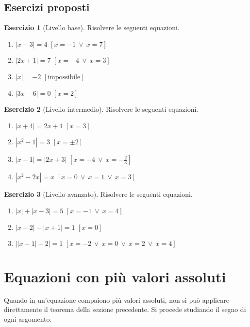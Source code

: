 \documentclass[12pt,a4paper,openany]{book}
\theoremstyle{definition}
\newtheorem{esercizio}{Esercizio}[section]
\theoremstyle{plain}
\theoremstyle{remark}
\newcommand{\abs}[1]{\left|#1\right|}
\begin{document}
\subsection*{Esercizi proposti}

\begin{esercizio}[Livello base]
Risolvere le seguenti equazioni.
\begin{enumerate}[label=\alph*)]
\item $\abs{x-3}=4$ \hfill $[x=-1\ \lor\ x=7]$
\item $\abs{2x+1}=7$ \hfill $[x=-4\ \lor\ x=3]$
\item $\abs{x}=-2$ \hfill $[\text{impossibile}]$
\item $\abs{3x-6}=0$ \hfill $[x=2]$
\end{enumerate}
\end{esercizio}

\begin{esercizio}[Livello intermedio]
Risolvere le seguenti equazioni.
\begin{enumerate}[label=\alph*)]
\item $\abs{x+4}=2x+1$ \hfill $[x=3]$
\item $\abs{x^2-1}=3$ \hfill $[x=\pm 2]$
\item $\abs{x-1}=\abs{2x+3}$ \hfill $[x=-4\ \lor\ x=-\tfrac23]$
\item $\abs{x^2-2x}=x$ \hfill $[x=0\ \lor\ x=1\ \lor\ x=3]$
\end{enumerate}
\end{esercizio}

\begin{esercizio}[Livello avanzato]
Risolvere le seguenti equazioni.
\begin{enumerate}[label=\alph*)]
\item $\abs{x}+\abs{x-3}=5$ \hfill $[x=-1\ \lor\ x=4]$
\item $\abs{x-2}-\abs{x+1}=1$ \hfill $[x=0]$
\item $\bigl|\abs{x-1}-2\bigr|=1$ \hfill $[x=-2\ \lor\ x=0\ \lor\ x=2\ \lor\ x=4]$
\end{enumerate}
\end{esercizio}

\section{Equazioni con più valori assoluti}

Quando in un'equazione compaiono più valori assoluti, non si può applicare direttamente il teorema della sezione precedente. Si procede studiando il segno di ogni argomento.
\end{document}
